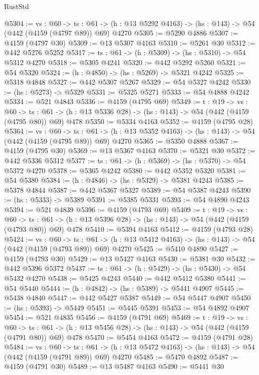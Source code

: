 \begin{lexlean}{RustStd}
\begin{coremodule}
@5304 := {vs : @60} ->
  {ts : @61} -> (h : @13 @5292 @4163) -> (hs : @143) -> @54 (@442 (@4159 (@4797 @89)) @69) @4270
@5305 := @5290 @4886
@5307 := @4159 (@4797 @30)
@5309 := @13 @5307 @4163
@5310 := @5261 @30
@5312 := @442 @5276 @5252
@5317 := {ts : @61} -> (h : @5309) -> (hs : @5310) -> @54 @5312 @4270
@5318 := @5305 @4241
@5320 := @442 @5292 @5260
@5321 := @54 @5320
@5324 := (h : @4850) -> (hs : @5269) -> @5321 @4242
@5325 := @5318 @4848
@5327 := @442 @5307 @5267
@5329 := @54 @5327 @4242
@5330 := (hs : @5273) -> @5329
@5331 := @5325 @5271
@5333 := @54 @4888 @4242
@5334 := @521 @4843
@5336 := @4159 (@4795 @69)
@5349 := {t : @19} ->
  {vs : @60} ->
  {ts : @61} -> (h : @13 @5336 @28) -> (hs : @143) -> @54 (@442 (@4159 (@4795 @80)) @69) @478
@5350 := @5334 @4163
@5352 := @4159 (@4795 @28)
@5364 := {vs : @60} ->
  {ts : @61} -> (h : @13 @5352 @4163) -> (hs : @143) -> @54 (@442 (@4159 (@4795 @89)) @69) @4270
@5365 := @5350 @4888
@5367 := @4159 (@4795 @30)
@5369 := @13 @5367 @4163
@5370 := @5321 @30
@5372 := @442 @5336 @5312
@5377 := {ts : @61} -> (h : @5369) -> (hs : @5370) -> @54 @5372 @4270
@5378 := @5365 @4242
@5380 := @442 @5352 @5320
@5381 := @54 @5380
@5384 := (h : @4846) -> (hs : @5329) -> @5381 @4243
@5385 := @5378 @4844
@5387 := @442 @5367 @5327
@5389 := @54 @5387 @4243
@5390 := (hs : @5333) -> @5389
@5391 := @5385 @5331
@5393 := @54 @4890 @4243
@5394 := @521 @4839
@5396 := @4159 (@4793 @69)
@5409 := {t : @19} ->
  {vs : @60} ->
  {ts : @61} -> (h : @13 @5396 @28) -> (hs : @143) -> @54 (@442 (@4159 (@4793 @80)) @69) @478
@5410 := @5394 @4163
@5412 := @4159 (@4793 @28)
@5424 := {vs : @60} ->
  {ts : @61} -> (h : @13 @5412 @4163) -> (hs : @143) -> @54 (@442 (@4159 (@4793 @89)) @69) @4270
@5425 := @5410 @4890
@5427 := @4159 (@4793 @30)
@5429 := @13 @5427 @4163
@5430 := @5381 @30
@5432 := @442 @5396 @5372
@5437 := {ts : @61} -> (h : @5429) -> (hs : @5430) -> @54 @5432 @4270
@5438 := @5425 @4243
@5440 := @442 @5412 @5380
@5441 := @54 @5440
@5444 := (h : @4842) -> (hs : @5389) -> @5441 @4907
@5445 := @5438 @4840
@5447 := @442 @5427 @5387
@5449 := @54 @5447 @4907
@5450 := (hs : @5393) -> @5449
@5451 := @5445 @5391
@5453 := @54 @4892 @4907
@5454 := @521 @4835
@5456 := @4159 (@4791 @69)
@5469 := {t : @19} ->
  {vs : @60} ->
  {ts : @61} -> (h : @13 @5456 @28) -> (hs : @143) -> @54 (@442 (@4159 (@4791 @80)) @69) @478
@5470 := @5454 @4163
@5472 := @4159 (@4791 @28)
@5484 := {vs : @60} ->
  {ts : @61} -> (h : @13 @5472 @4163) -> (hs : @143) -> @54 (@442 (@4159 (@4791 @89)) @69) @4270
@5485 := @5470 @4892
@5487 := @4159 (@4791 @30)
@5489 := @13 @5487 @4163
@5490 := @5441 @30

\end{coremodule}
\end{lexlean}
